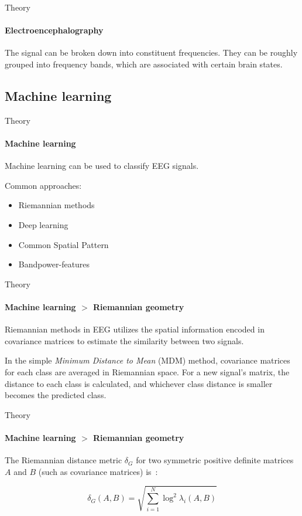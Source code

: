 \documentclass[xcolor={dvipsnames,table},12pt]{beamer}
\begin{document}
\begin{frame}{Theory}
    \framesubtitle{Electroencephalography}
    The signal can be broken down into constituent frequencies. They can be roughly grouped into frequency bands, which are associated with certain brain states.

    {
        \small
        
    }
\end{frame}

\subsection{Machine learning}
\begin{frame}{Theory}
    \framesubtitle{Machine learning}

    Machine learning can be used to classify EEG signals.

    Common approaches: 
    \begin{itemize}
        \item Riemannian methods
        \item Deep learning
        \item Common Spatial Pattern
        \item Bandpower-features
    \end{itemize}
\end{frame}

\begin{frame}{Theory}
    \framesubtitle{Machine learning $>$ Riemannian geometry}
    
    Riemannian methods in EEG utilizes the spatial information encoded in covariance matrices to estimate the similarity between two signals.

    In the simple \emph{Minimum Distance to Mean} (MDM) method, covariance matrices for each class are averaged in Riemannian space. For a new signal's matrix, the distance to each class is calculated, and whichever class distance is smaller becomes the predicted class.
\end{frame}

\begin{frame}{Theory}
    \framesubtitle{Machine learning $>$ Riemannian geometry}
    
    \small The Riemannian distance metric $\delta_G$ for two symmetric positive definite matrices $A$ and $B$ (such as covariance matrices) is~\cite{grafarend_metric_2003}:

        \[ \delta_G(A, B) = \sqrt{\sum_{i=1}^N \log^2 \lambda_i (A, B) } \]
\end{frame}
\end{document}
